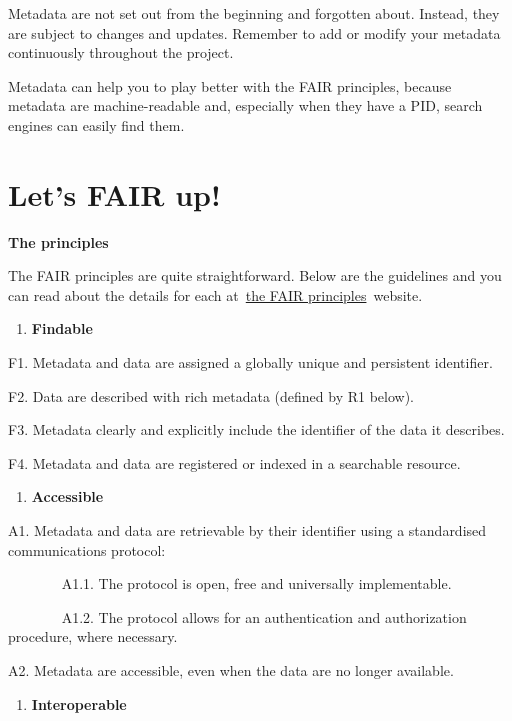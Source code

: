 \documentclass[
]{book}
\providecommand{\tightlist}{%
  \setlength{\itemsep}{0pt}\setlength{\parskip}{0pt}}
\begin{document}
Metadata are not set out from the beginning and forgotten about. Instead, they are subject to changes and updates. Remember to add or modify your metadata continuously throughout the project.

Metadata can help you to play better with the FAIR principles, because metadata are machine-readable and, especially when they have a PID, search engines can easily find them.

\hypertarget{lets-fair-up}{%
\section{\texorpdfstring{\textbf{Let's FAIR up!}}{Let's FAIR up!}}\label{lets-fair-up}}

\textbf{The principles}

The FAIR principles are quite straightforward. Below are the guidelines and you can read about the details for each at~\href{https://www.go-fair.org/fair-principles/}{the FAIR principles}~website.

\begin{enumerate}
\def\labelenumi{\arabic{enumi}.}
\tightlist
\item
  \textbf{Findable}
\end{enumerate}

F1. Metadata and data are assigned a globally unique and persistent identifier.

F2. Data are described with rich metadata (defined by R1 below).

F3. Metadata clearly and explicitly include the identifier of the data it describes.

F4. Metadata and data are registered or indexed in a searchable resource.

\begin{enumerate}
\def\labelenumi{\arabic{enumi}.}
\tightlist
\item
  \textbf{Accessible}
\end{enumerate}

A1. Metadata and data are retrievable by their identifier using a standardised communications protocol:

~ ~ ~ ~ ~A1.1. The protocol is open, free and universally implementable.

~ ~ ~ ~ ~A1.2. The protocol allows for an authentication and authorization procedure, where necessary.

A2. Metadata are accessible, even when the data are no longer available.

\begin{enumerate}
\def\labelenumi{\arabic{enumi}.}
\tightlist
\item
  \textbf{Interoperable}
\end{enumerate}
\end{document}
